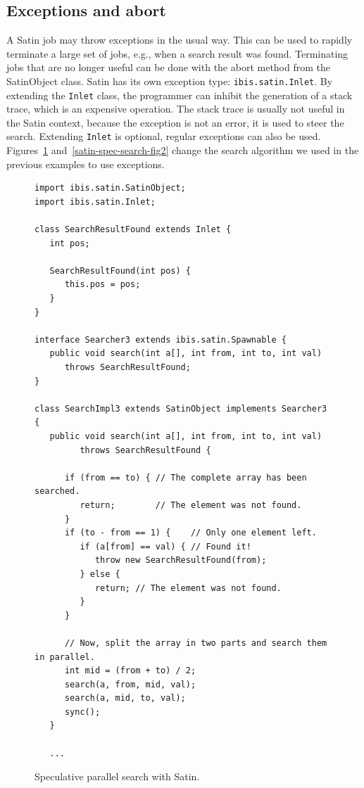 \documentclass[10pt]{article}
\newcommand{\mysubsection}[1]{\subsection{#1}\label{#1}}
\begin{document}
\mysubsection{Exceptions and abort}

A Satin job may
throw exceptions in the usual way. This can be used to rapidly
terminate a large set of jobs, e.g., when a search result was
found. Terminating jobs that are no longer useful can be done with the
abort method from the SatinObject class.  Satin has its own exception
type: \texttt{ibis.satin.Inlet}.  By extending the \texttt{Inlet} class,
the programmer can inhibit the generation of a stack trace,
which is an expensive operation.
The stack trace is usually not useful in the Satin context,
because the exception is not an error, it is used to steer the
search. Extending \texttt{Inlet} is optional, regular exceptions can also be
used. Figures~\ref{satin-spec-search-fig1} and~\ref{satin-spec-search-fig2} change the search algorithm we used in the previous
examples to use exceptions.

\begin{figure}[t!]
{\small
\begin{verbatim}
import ibis.satin.SatinObject;
import ibis.satin.Inlet;

class SearchResultFound extends Inlet {
   int pos;

   SearchResultFound(int pos) {
      this.pos = pos;
   }
}

interface Searcher3 extends ibis.satin.Spawnable {
   public void search(int a[], int from, int to, int val)
      throws SearchResultFound;
}

class SearchImpl3 extends SatinObject implements Searcher3 {
   public void search(int a[], int from, int to, int val)
         throws SearchResultFound {

      if (from == to) { // The complete array has been searched.
         return;        // The element was not found.
      }
      if (to - from == 1) {    // Only one element left.
         if (a[from] == val) { // Found it!
            throw new SearchResultFound(from);
         } else {
            return; // The element was not found.
         }
      }

      // Now, split the array in two parts and search them in parallel.
      int mid = (from + to) / 2;
      search(a, from, mid, val);
      search(a, mid, to, val);
      sync();
   }

   ...
\end{verbatim}
}
\caption{Speculative parallel search with Satin.}
\label{satin-spec-search-fig1}
\end{figure}
\end{document}

